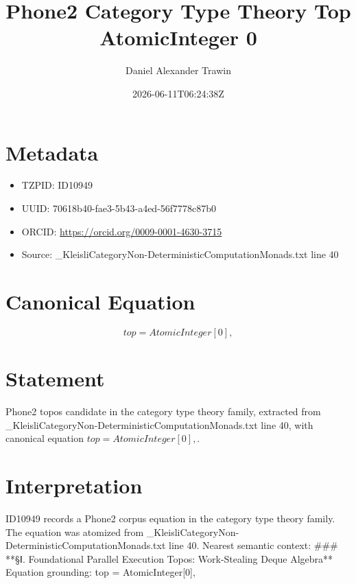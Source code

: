 \documentclass[11pt]{article}
\title{Phone2 Category Type Theory Top AtomicInteger 0}
\author{Daniel Alexander Trawin}
\date{2026-06-11T06:24:38Z}
\begin{document}
\maketitle
\section*{Metadata}
\begin{itemize}
\item TZPID: ID10949
\item UUID: 70618b40-fae3-5b43-a4ed-56f7778c87b0
\item ORCID: \url{https://orcid.org/0009-0001-4630-3715}
\item Source: _KleisliCategoryNon-DeterministicComputationMonads.txt line 40
\end{itemize}
\section*{Canonical Equation}
\[
top = AtomicInteger[0],
\]
\section*{Statement}
Phone2 topos candidate in the category type theory family, extracted from _KleisliCategoryNon-DeterministicComputationMonads.txt line 40, with canonical equation $top = AtomicInteger[0],$.
\section*{Interpretation}
ID10949 records a Phone2 corpus equation in the category type theory family. The equation was atomized from _KleisliCategoryNon-DeterministicComputationMonads.txt line 40. Nearest semantic context: ### **§Ⅰ. Foundational Parallel Execution Topos: Work-Stealing Deque Algebra** Equation grounding: top = AtomicInteger[0],
\end{document}
